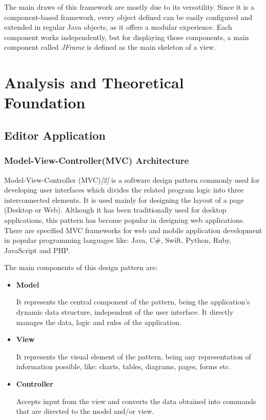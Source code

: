 \documentclass[12pt,a4paper,twoside]{report}
\begin{document}
The main draws of this framework are mostly due to its versatility. Since it is a component-based framework, every object defined can be easily configured and extended in regular Java objects, as it offers a modular experience. Each component works independently, but for displaying those components, a main component called \textit{JFrame} is defined as the main skeleton of a view. 



\chapter{Analysis and Theoretical Foundation}
\section{Editor Application}
\subsection{Model-View-Controller(MVC) Architecture}

Model-View-Controller (MVC)\textit{[2]} is a software design pattern commonly used for developing user interfaces which divides the related program logic into three interconnected elements. It is used mainly for designing the layout of a page (Desktop or Web). Although it has been traditionally used for desktop applications, this pattern has become popular in designing web applications. There are specified MVC frameworks for web and mobile application development in popular programming languages like: Java, C\#, Swift, Python, Ruby, JavaScript and PHP.


The main components of this design pattern are:

\begin{itemize}
\item \textbf{Model}
		
It represents the central component of the pattern, being the application's dynamic data structure, independent of the user interface. It directly manages the data, logic and rules of the application.

\item \textbf{View}

It represents the visual element of the pattern, being any representation of information possible, like: charts, tables, diagrams, pages, forms etc. 

\item \textbf{Controller}

Accepts input from the view and converts the data obtained into commands that are directed to the model and/or view.
\end{itemize}
\end{document}

